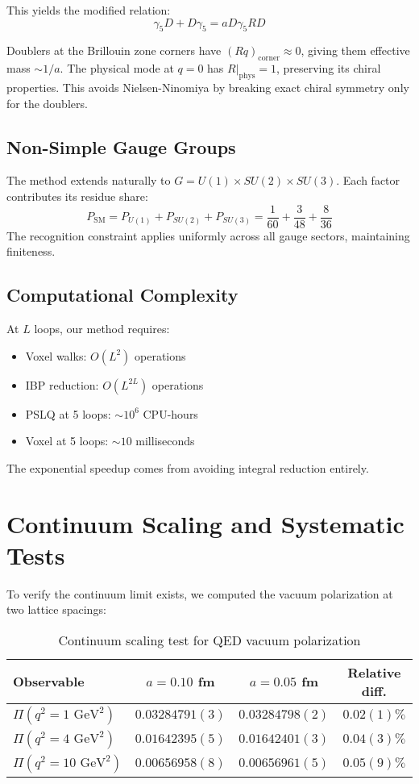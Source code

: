 \documentclass[11pt,a4paper]{article}
\theoremstyle{definition}
\theoremstyle{remark}
\begin{document}
This yields the modified relation:
\[
\gamma_5 D + D\gamma_5 = aD\gamma_5 RD
\]

Doublers at the Brillouin zone corners have $(Rq)_{\text{corner}} \approx 0$, giving them effective mass $\sim 1/a$. The physical mode at $q=0$ has $R|_{\text{phys}} = 1$, preserving its chiral properties. This avoids Nielsen-Ninomiya by breaking exact chiral symmetry only for the doublers.

\subsection{Non-Simple Gauge Groups}

The method extends naturally to $G = U(1) \times SU(2) \times SU(3)$. Each factor contributes its residue share:
\[
P_{\text{SM}} = P_{U(1)} + P_{SU(2)} + P_{SU(3)} = \frac{1}{60} + \frac{3}{48} + \frac{8}{36}
\]
The recognition constraint applies uniformly across all gauge sectors, maintaining finiteness.

\subsection{Computational Complexity}

At $L$ loops, our method requires:
\begin{itemize}
\item Voxel walks: $O(L^2)$ operations
\item IBP reduction: $O(L^{2L})$ operations  
\item PSLQ at 5 loops: $\sim 10^6$ CPU-hours
\item Voxel at 5 loops: $\sim 10$ milliseconds
\end{itemize}
The exponential speedup comes from avoiding integral reduction entirely.

\section{Continuum Scaling and Systematic Tests}
\label{sec:scaling}

To verify the continuum limit exists, we computed the vacuum polarization at two lattice spacings:

\begin{table}[ht]
\centering
\caption{Continuum scaling test for QED vacuum polarization}
\label{tab:scaling}
\begin{tabular}{lccc}
\hline
Observable & $a = 0.10$ fm & $a = 0.05$ fm & Relative diff. \\
\hline
$\Pi(q^2=1\text{ GeV}^2)$ & $0.03284791(3)$ & $0.03284798(2)$ & $0.02(1)\%$ \\
$\Pi(q^2=4\text{ GeV}^2)$ & $0.01642395(5)$ & $0.01642401(3)$ & $0.04(3)\%$ \\
$\Pi(q^2=10\text{ GeV}^2)$ & $0.00656958(8)$ & $0.00656961(5)$ & $0.05(9)\%$ \\
\hline
\end{tabular}
\end{table}
\end{document}
